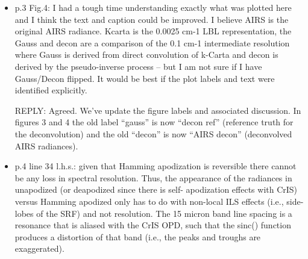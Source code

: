 \documentclass[11pt]{article}
\newcommand {\reply} {\mbox{\small REPLY}}
\begin{document}
\begin{itemize}
  \reply: We agree, medium to long term.  But in the meantime we
  have the significant overlap of AIRS and CrIS NSR data to work
  with.  The effective resolution of deconvolved AIRS does not take
  us quite to CrIS FSR for the MW and SW bands.  You can still do a
  translation but the residuals are relatively large in comparison
  with those shown in the paper.

  One solution might be to pick an intermediate resolution for CrIS,
  for example 0.6 \wn\ in the MW, that roughly corresponds to the
  AIRS effective resolution, and we've added a note to that effect.
  This is easy to do for both regular CrIS processing and our AIRS
  to CrIS translation.  In both cases we have an intermediate
  representation---sensor grid for CrIS and our deconvolution grid
  for AIRS---that can be resampled to any nominal resolution we
  like.  We've expanded the discussion of NSR and FSR at the end of
  the CrIS translation section and used this topic as a lead-in to
  the next section, translation to an idealized grating model.

\item p.3 Fig.4: I had a tough time understanding exactly what was
  plotted here and I think the text and caption could be improved.
  I believe AIRS is the original AIRS radiance. Kcarta is the 0.0025
  cm-1 LBL representation, the Gauss and decon are a comparison of
  the 0.1 cm-1 intermediate resolution where Gauss is derived from
  direct convolution of k-Carta and decon is derived by the
  pseudo-inverse process – but I am not sure if I have Gauss/Decon
  flipped. It would be best if the plot labels and text were
  identified explicitly.

  \reply: Agreed.  We've update the figure labels and associated
  discussion.  In figures 3 and 4 the old label ``gauss'' is now
  ``decon ref'' (reference truth for the deconvolution) and the old
  ``decon'' is now ``AIRS decon'' (deconvolved AIRS radiances).

\item p.4 line 34 l.h.s.: given that Hamming apodization is
  reversible there cannot be any loss in spectral resolution. Thus,
  the appearance of the radiances in unapodized (or deapodized since
  there is self- apodization effects with CrIS) versus Hamming
  apodized only has to do with non-local ILS effects (i.e.,
  side-lobes of the SRF) and not resolution. The 15 micron band line
  spacing is a resonance that is aliased with the CrIS OPD, such
  that the sinc() function produces a distortion of that band (i.e.,
  the peaks and troughs are exaggerated).


\end{itemize}
\end{document}

